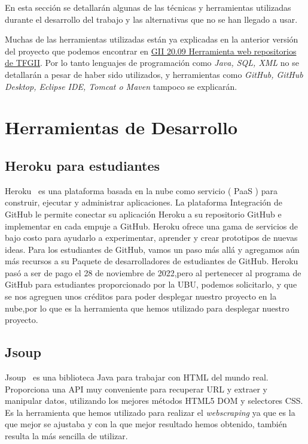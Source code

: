 En esta sección se detallarán algunas de las técnicas y herramientas utilizadas durante el desarrollo del trabajo y las alternativas que no se han llegado a usar.

Muchas de las herramientas utilizadas están ya explicadas en la anterior versión del proyecto que podemos encontrar en \href{https://github.com/dbo1001/Gestor-TFG-2021}{GII 20.09 Herramienta web repositorios de TFGII}. Por lo tanto lenguajes de programación como \emph{Java, SQL, XML} no se detallarán a pesar de haber sido utilizados, y herramientas como \emph{GitHub, GitHub Desktop, Eclipse IDE, Tomcat o Maven} tampoco se explicarán.

\section{Herramientas de Desarrollo}

\subsection{Heroku para estudiantes}
Heroku~\cite{heroku_students} es una plataforma basada en la nube como servicio ( PaaS ) para construir, ejecutar y administrar aplicaciones. 
La plataforma Integración de GitHub le permite conectar su aplicación Heroku a su repositorio GitHub e implementar en cada empuje a GitHub.
Heroku ofrece una gama de servicios de bajo costo para ayudarlo a experimentar, aprender y crear prototipos de nuevas ideas. Para los estudiantes de GitHub, vamos un paso más allá y agregamos aún más recursos a su Paquete de desarrolladores de estudiantes de GitHub. 
Heroku pasó a ser de pago el 28 de noviembre de 2022,pero al pertenecer al programa de GitHub para estudiantes proporcionado por la UBU, podemos solicitarlo, y que se nos agreguen unos créditos para poder desplegar nuestro proyecto en la nube,por lo que es la herramienta que hemos utilizado para desplegar nuestro proyecto.

\subsection{Jsoup}
Jsoup~\cite{jsoup} es una biblioteca Java para trabajar con HTML del mundo real. Proporciona una API muy conveniente para recuperar URL y extraer y manipular datos, utilizando los mejores métodos HTML5 DOM y selectores CSS. 
Es la herramienta que hemos utilizado para realizar el \emph{webscraping} ya que es la que mejor se ajustaba y con la que mejor resultado hemos obtenido, también resulta la más sencilla de utilizar.

